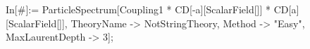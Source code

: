 In[#]:= ParticleSpectrum[Coupling1 * CD[-a][ScalarField[]] * CD[a][ScalarField[]], TheoryName -> NotStringTheory, Method -> "Easy", MaxLaurentDepth -> 3]; 
